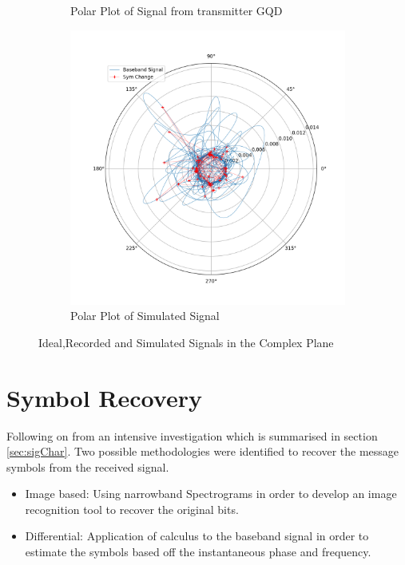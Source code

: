 \begin{figure}[h!]
\begin{subfigure}[b]{0.4\textwidth}
        \caption{\centering Polar Plot of Signal from transmitter GQD}
        \label{fig:polarreal}
    \end{subfigure}
        \begin{subfigure}[b]{0.4\textwidth}
        \centering
       \includegraphics[width = \textwidth]{figs/sim/veri/PolarSim.png}
        \caption{Polar Plot of Simulated Signal}
        \label{fig:polarSim}
    \end{subfigure}
    \caption{Ideal,Recorded and Simulated Signals in the Complex Plane}
    \label{fig:polar}
\end{figure}


\newpage
\section{Symbol Recovery}
Following on from an intensive investigation which is summarised in section \ref{sec:sigChar}. Two possible methodologies were identified to recover the message symbols from the received signal.

\begin{itemize}
    \item Image based: Using narrowband Spectrograms in order to develop an image recognition tool to recover the original bits.
    \item Differential: Application of calculus to the baseband signal in order to estimate the symbols based off the instantaneous phase and frequency.
\end{itemize}

